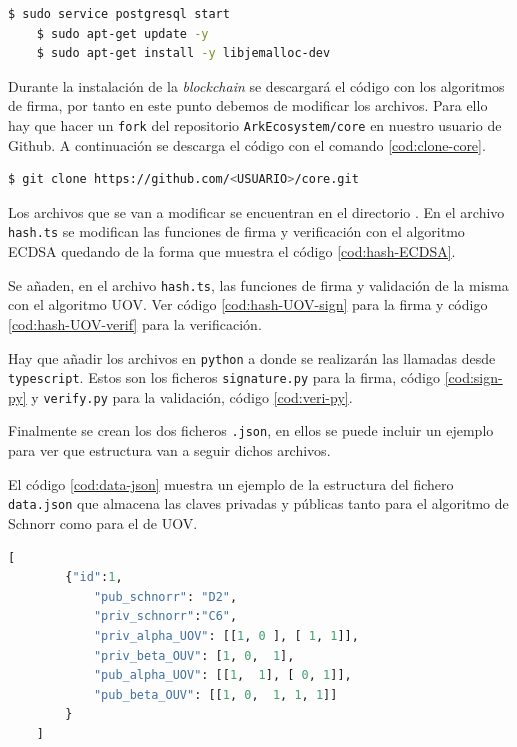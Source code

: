 \begin{lstlisting}[language=Bash,caption=Instalación \textit{blockchain}. Parte X, label=cod:start-sql, style=Consola]
	$ sudo service postgresql start
	$ sudo apt-get update -y 
	$ sudo apt-get install -y libjemalloc-dev
\end{lstlisting}

Durante la instalación de la \textit{blockchain} se descargará el código con los algoritmos de firma, por tanto en este punto debemos de modificar los archivos. Para ello hay que hacer un \texttt{fork} del repositorio \texttt{ArkEcosystem/core} \cite{ark-core} en nuestro usuario de Github. A continuación se descarga el código con el comando \ref{cod:clone-core}.

\begin{lstlisting}[language=Bash,caption=Clonar nuevo core, label=cod:clone-core, style=Consola]
	$ git clone https://github.com/<USUARIO>/core.git
\end{lstlisting}

Los archivos que se van a modificar se encuentran en el directorio . En el archivo \texttt{hash.ts} se modifican las funciones de firma y verificación con el algoritmo ECDSA quedando de la forma que muestra el código \ref{cod:hash-ECDSA}.



\newpage
Se añaden, en el archivo \texttt{hash.ts}, las funciones de firma y validación de la misma con el algoritmo UOV. Ver código \ref{cod:hash-UOV-sign} para la firma y código \ref{cod:hash-UOV-verif} para la verificación.



Hay que añadir los archivos en \texttt{python} a donde se realizarán las llamadas desde \texttt{typescript}. Estos son los ficheros \texttt{signature.py} para la firma, código \ref{cod:sign-py} y \texttt{verify.py} para la validación, código \ref{cod:veri-py}.




Finalmente se crean los dos ficheros \texttt{.json}, en ellos se puede incluir un ejemplo para ver que estructura van a seguir dichos archivos. 

El código \ref{cod:data-json} muestra un ejemplo de la estructura del fichero \texttt{data.json} que almacena las claves privadas y públicas tanto para el algoritmo de Schnorr como para el de UOV.

\begin{lstlisting}[language=Python,caption=Ejemplo fichero \texttt{data.json}, label=cod:data-json]
	[
		{"id":1,
			"pub_schnorr": "D2",
			"priv_schnorr":"C6",
			"priv_alpha_UOV": [[1, 0 ], [ 1, 1]],
			"priv_beta_OUV": [1, 0,  1],
			"pub_alpha_UOV": [[1,  1], [ 0, 1]],
			"pub_beta_OUV": [[1, 0,  1, 1, 1]]
		}
	]
\end{lstlisting}


